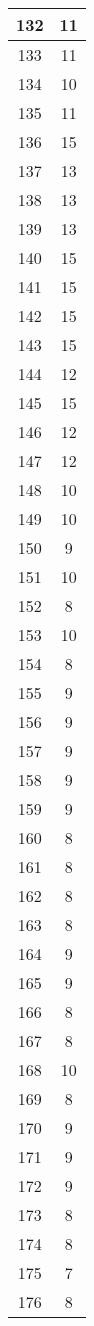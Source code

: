 \documentclass[letterpaper, 12pt]{article}
\begin{document}
\begin{longtable}{|c|c|}
\hline
132 & 11 \\
\hline
133 & 11 \\
\hline
134 & 10 \\
\hline
135 & 11 \\
\hline
136 & 15 \\
\hline
137 & 13 \\
\hline
138 & 13 \\
\hline
139 & 13 \\
\hline
140 & 15 \\
\hline
141 & 15 \\
\hline
142 & 15 \\
\hline
143 & 15 \\
\hline
144 & 12 \\
\hline
145 & 15 \\
\hline
146 & 12 \\
\hline
147 & 12 \\
\hline
148 & 10 \\
\hline
149 & 10 \\
\hline
150 & 9 \\
\hline
151 & 10 \\
\hline
152 & 8 \\
\hline
153 & 10 \\
\hline
154 & 8 \\
\hline
155 & 9 \\
\hline
156 & 9 \\
\hline
157 & 9 \\
\hline
158 & 9 \\
\hline
159 & 9 \\
\hline
160 & 8 \\
\hline
161 & 8 \\
\hline
162 & 8 \\
\hline
163 & 8 \\
\hline
164 & 9 \\
\hline
165 & 9 \\
\hline
166 & 8 \\
\hline
167 & 8 \\
\hline
168 & 10 \\
\hline
169 & 8 \\
\hline
170 & 9 \\
\hline
171 & 9 \\
\hline
172 & 9 \\
\hline
173 & 8 \\
\hline
174 & 8 \\
\hline
175 & 7 \\
\hline
176 & 8 \\

\end{longtable}
\end{document}
